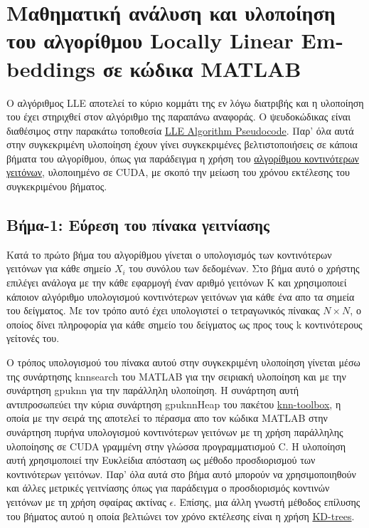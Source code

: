 \section{Μαθηματική ανάλυση και υλοποίηση του αλγορίθμου \textlatin{Locally Linear Embeddings} σε κώδικα \textlatin{MATLAB}}
\par
Ο αλγόριθμος \textlatin{LLE}\cite{lle} αποτελεί το κύριο κομμάτι της εν λόγω διατριβής και η υλοποίηση του έχει στηριχθεί στον αλγόριθμο της παραπάνω αναφοράς. Ο ψευδοκώδικας είναι διαθέσιμος στην παρακάτω τοποθεσία \href{https://www.cs.nyu.edu/~roweis/lle/algorithm.html}{\textlatin{LLE Algorithm Pseudocode}}. Παρ' όλα αυτά στην συγκεκριμένη υλοποίηση έχουν γίνει συγκεκριμένες βελτιστοποιήσεις σε κάποια βήματα του αλγορίθμου, όπως για παράδειγμα η χρήση του \href{http://autogpu.ee.auth.gr/doku.php?id=cuknns:gpu_accelerated_k-nearest_neighbor_library}{αλγορίθμου κοντινότερων γειτόνων}, υλοποιημένο σε \textlatin{CUDA}, με σκοπό την μείωση του χρόνου εκτέλεσης του συγκεκριμένου βήματος. 

\subsection{Βήμα-1: Εύρεση του πίνακα γειτνίασης}
\par
Κατά το πρώτο βήμα του αλγορίθμου γίνεται ο υπολογισμός των κοντινότερων γειτόνων για κάθε σημείο $X_{i}$ του συνόλου των δεδομένων. Στο βήμα αυτό ο χρήστης επιλέγει ανάλογα με την κάθε εφαρμογή έναν αριθμό γειτόνων \textlatin{K} και χρησιμοποιεί κάποιον αλγόριθμο υπολογισμού κοντινότερων γειτόνων για κάθε ένα απο τα σημεία του δείγματος. Με τον τρόπο αυτό έχει υπολογιστεί ο τετραγωνικός πίνακας $N \times N$, ο οποίος δίνει πληροφορία για κάθε σημείο του δείγματος ως προς τους \textlatin{k} κοντινότερους γείτονές του.
\par
Ο τρόπος υπολογισμού του πίνακα αυτού στην συγκεκριμένη υλοποίηση γίνεται μέσω της συνάρτησης \textlatin{knnsearch} του \textlatin{MATLAB} για την σειριακή υλοποίηση και με την συνάρτηση \textlatin{gpu\textunderscore knn} για την παράλληλη υλοποίηση. Η συνάρτηση αυτή αντιπροσωπεύει την κύρια συνάρτηση \textlatin{gpuknnHeap} του πακέτου \href{http://autogpu.ee.auth.gr/doku.php?id=cuknns:gpu_accelerated_k-nearest_neighbor_library}{\textlatin{knn-toolbox}}, η οποία με την σειρά της αποτελεί το πέρασμα απο τον κώδικα \textlatin{MATLAB} στην συνάρτηση πυρήνα υπολογισμού κοντινότερων γειτόνων με τη χρήση παράλληλης υλοποίησης σε \textlatin{CUDA} γραμμένη στην γλώσσα προγραμματισμού \textlatin{C}. Η υλοποίηση αυτή χρησιμοποιεί την Ευκλείδια απόσταση ως μέθοδο προσδιορισμού των κοντινότερων γειτόνων. Παρ' όλα αυτά στο βήμα αυτό μπορούν να χρησιμοποιηθούν και άλλες μετρικές γειτνίασης όπως για παράδειγμα ο προσδιορισμός κοντινών γειτόνων με τη χρήση σφαίρας ακτίνας $\epsilon$. Επίσης, μια άλλη γνωστή μέθοδος επίλυσης του βήματος αυτού η οποία βελτιώνει τον χρόνο εκτέλεσης είναι η χρήση \href{https://en.wikipedia.org/wiki/K-d_tree}{\textlatin{KD-trees}}.

